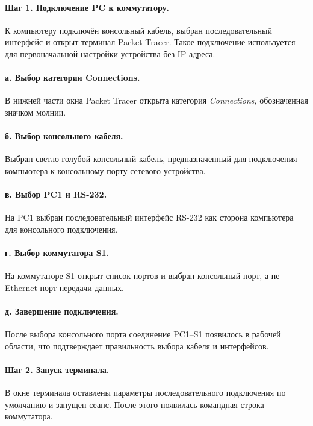 \documentclass[a4paper,14pt,oneside]{extarticle}
\begin{document}
\paragraph{Шаг 1. Подключение PC к коммутатору.}
К компьютеру подключён консольный кабель, выбран последовательный интерфейс
и открыт терминал Packet Tracer. Такое подключение используется для
первоначальной настройки устройства без IP-адреса.

\paragraph{а. Выбор категории Connections.}
В нижней части окна Packet Tracer открыта категория
\textit{Connections}, обозначенная значком молнии.

\paragraph{б. Выбор консольного кабеля.}
Выбран светло-голубой консольный кабель, предназначенный для подключения
компьютера к консольному порту сетевого устройства.

\paragraph{в. Выбор PC1 и RS-232.}
На PC1 выбран последовательный интерфейс RS-232 как сторона компьютера
для консольного подключения.

\paragraph{г. Выбор коммутатора S1.}
На коммутаторе S1 открыт список портов и выбран консольный порт, а не
Ethernet-порт передачи данных.

\paragraph{д. Завершение подключения.}
После выбора консольного порта соединение PC1--S1 появилось в рабочей
области, что подтверждает правильность выбора кабеля и интерфейсов.

\paragraph{Шаг 2. Запуск терминала.}
В окне терминала оставлены параметры последовательного подключения по
умолчанию и запущен сеанс. После этого появилась командная строка
коммутатора.
\end{document}
